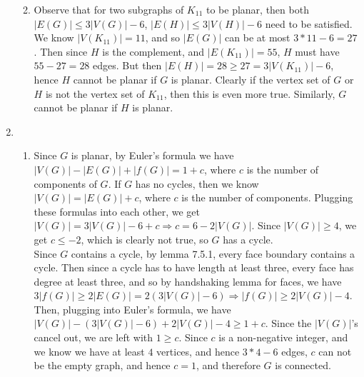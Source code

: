 \documentclass[10pt,english]{article}
\begin{document}
\begin{enumerate}
\begin{enumerate}



    \item Observe that for two subgraphs of $K_{11}$ to be planar, then both $|E(G)|\leq 3|V(G)|-6$, $|E(H)|\leq 3|V(H)|-6$ need to be satisfied. We know $|V(K_{11})|=11$, and so $|E(G)|$ can be at most $3*11-6=27$. Then since $H$ is the complement, and $|E(K_{11})|=55$, $H$ must have $55-27=28$ edges. But then $|E(H)|=28\geq 27 =3|V(K_{11})|-6$, hence $H$ cannot be planar if $G$ is planar. Clearly if the vertex set of $G$ or $H$ is not the vertex set of $K_{11}$, then this is even more true. Similarly, $G$ cannot be planar if $H$ is planar. 
\end{enumerate}

\pagebreak
\item \begin{enumerate}
    \item Since $G$ is planar, by Euler's formula we have $|V(G)|-|E(G)|+|f(G)|=1+c$, where $c$ is the number of components of $G$. If $G$ has no cycles, then we know $|V(G)|=|E(G)|+c$, where $c$ is the number of components. Plugging these formulas into each other, we get $|V(G)|=3|V(G)|-6+c\Rightarrow c=6-2|V(G)|$. Since $|V(G)|\geq4$, we get $c\leq -2$, which is clearly not true, so $G$ has a cycle. \\ 
    Since $G$ contains a cycle, by lemma 7.5.1, every face boundary contains a cycle. Then since a cycle has to have length at least three, every face has degree at least three, and so by handshaking lemma for faces, we have $3|f(G)|\geq 2|E(G)|=2(3|V(G)|-6)\Rightarrow |f(G)|\geq 2|V(G)|-4$. Then, plugging into Euler's formula, we have $|V(G)|-(3|V(G)|-6)+2|V(G)|-4\geq 1+c$. Since the $|V(G)|$'s cancel out, we are left with $1\geq c$. Since $c$ is a non-negative integer, and we know we have at least $4$ vertices, and hence $3*4-6$ edges, $c$ can not be the empty graph, and hence $c=1$, and therefore $G$ is connected. 
    

\end{enumerate}
\end{enumerate}
\end{document}
